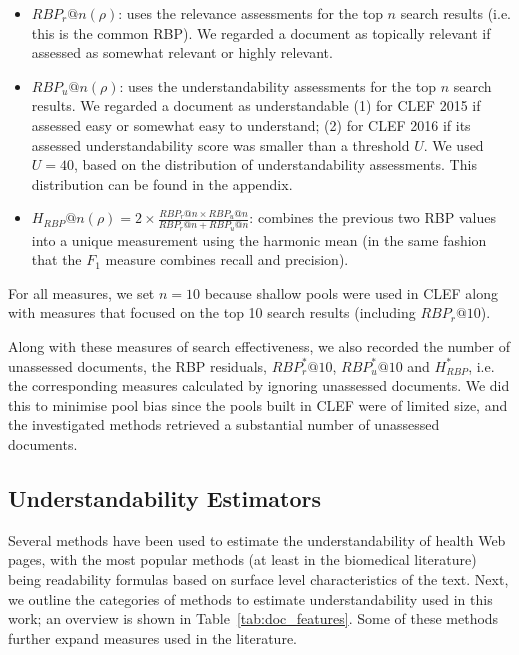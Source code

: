 \begin{itemize}[leftmargin=*]
	\item $RBP_r@n(\rho)$: uses the relevance assessments for the top $n$ search results (i.e. this is the common RBP). We regarded a document as topically relevant if assessed as somewhat relevant or highly relevant.
	
    \item $RBP_u@n(\rho)$: uses the understandability assessments for the top $n$ search results. We regarded a document as understandable (1) for CLEF 2015 if assessed easy or somewhat easy to understand; (2) for CLEF 2016 if its assessed understandability score was smaller than a threshold $U$. We used $U = 40$, based on the distribution of understandability assessments. This distribution can be found in the appendix.
	
    \item $H_{RBP}@n(\rho) = 2 \times \frac{RBP_r@n \times RBP_u@n}{RBP_r@n + RBP_u@n}$: combines the previous two RBP values into a unique measurement using the harmonic mean (in the same fashion that the $F_1$ measure combines recall and precision).
\end{itemize}

\noindent For all measures, we set $n=10$ because shallow pools were used in CLEF along with measures that focused on the top 10 search results (including $RBP_r@10$).

Along with these measures of search effectiveness, we also recorded the number of unassessed documents, the RBP residuals,  $RBP^*_r@10$, $RBP^*_u@10$ and $H_{RBP}^*$, i.e. the corresponding measures calculated by ignoring unassessed documents. We did this to minimise pool bias since the pools built in CLEF were of limited size, and the investigated methods retrieved a substantial number of unassessed documents.


\subsection*{Understandability Estimators}
\label{sec:proxies}

Several methods have been used to estimate the understandability of health Web pages, with the most popular methods (at least in the biomedical literature) being readability formulas based on surface level characteristics of the text. Next, we outline the categories of methods to estimate understandability used in this work; an overview is shown in Table~\ref{tab:doc_features}. Some of these methods further expand measures used in the literature. 
 
